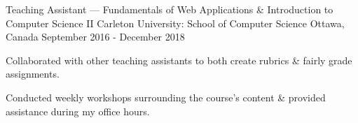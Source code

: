 \begin{cventries}
	\cventry
		{Teaching Assistant --- Fundamentals of Web Applications \& Introduction to Computer Science II}
		{Carleton University: School of Computer Science}
		{Ottawa, Canada}
		{September 2016 - December 2018}
		{\begin{cvitems}
			\item Collaborated with other teaching assistants to both create rubrics \& fairly grade assignments.
			\item Conducted weekly workshops surrounding the course's content \& provided assistance during my office hours.
		\end{cvitems}}
\end{cventries}
